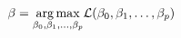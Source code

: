 \documentclass[preview]{standalone}
\begin{document}
\begin{align*}
\special{dvisvgm:raw <g id='unique000'>}\beta=\underset{\beta_0, \beta_1, \dots, \beta_p}{\arg\max}\mathcal{L}(\beta_0, \beta_1, \dots, \beta_p)\special{dvisvgm:raw </g>}
\end{align*}
\end{document}

